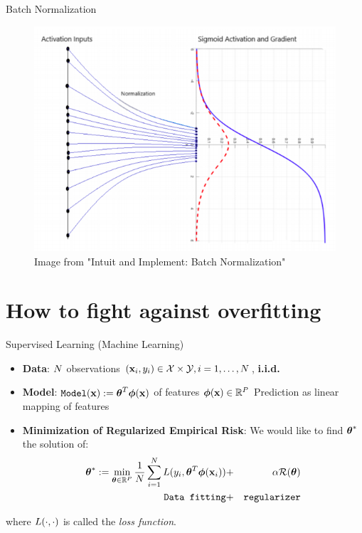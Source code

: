 \documentclass[handout,xcolor=pdftex,dvipsnames,table,mathserif]{beamer}
\begin{document}
\begin{frame}{Batch Normalization}
\begin{figure}
\includegraphics[width=.75 \columnwidth]{../graphics/BatchNormalization}
\caption{Image from "Intuit and Implement: Batch Normalization"}
\end{figure}
\end{frame}



\section{How to fight against overfitting}


\begin{frame}{Supervised Learning (Machine Learning)}
\begin{itemize}
\item \textbf{Data}: $N$ observations $(\mathbf{x}_i,y_i) \in \mathcal{X} \times \mathcal{Y}, i=1,\ldots,N$, \alert{\textbf{i.i.d.}}
\item \textbf{Model}: $\texttt{Model}(\mathbf{x}):=\boldsymbol{\theta}^T\boldsymbol{\phi} (\mathbf{x})$ of features  $\boldsymbol{\phi} (\mathbf{x}) \in \mathbb{R}^P$ \alert{Prediction as linear mapping of features}
\item \textbf{Minimization of Regularized Empirical Risk}: We would like to find $\boldsymbol{\theta}^{*}$ the solution of:
\begin{eqnarray*}
\boldsymbol{\theta}^{*}:=\min_{\boldsymbol{\theta} \in \mathbb{R}^P} \frac{1}{N} \sum_{i=1}^{N} L(y_i,\boldsymbol{\theta}^T\boldsymbol{\phi} (\mathbf{x}_i))&  + &\alpha \mathcal{R}(\boldsymbol{\theta}) \\
\texttt{Data fitting}& + &\texttt{regularizer}
\end{eqnarray*}
\end{itemize}
where $L(\cdot,\cdot)$ is called the  \emph{loss function}.
\end{frame}
\end{document}
